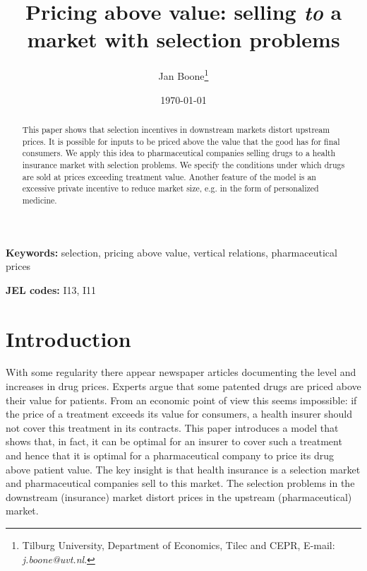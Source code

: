 \documentclass[a4paper,12pt]{article}
\author{Jan Boone\thanks{Tilburg University, Department of Economics, Tilec and CEPR, E-mail: \textit{j.boone@uvt.nl}.}}
\date{\today}
\title{Pricing above value: selling \emph{to} a market with selection problems}
\begin{document}
\maketitle
\maketitle
\begin{abstract}
This paper shows that selection incentives in downstream markets distort upstream prices. It is possible for inputs to be priced above the value that the good has for final consumers. We apply this idea to pharmaceutical companies selling drugs to a health insurance market with selection problems. We specify the conditions under which drugs are sold at prices exceeding treatment value. Another feature of the model is an excessive private incentive to reduce market size, e.g. in the form of personalized medicine.
\end{abstract}

\textbf{Keywords:} selection, pricing above value, vertical relations, pharmaceutical prices

\textbf{JEL codes:} I13, I11


\newpage

\section{Introduction}
\label{sec:org429004f}

With some regularity there appear newspaper articles documenting the level and increases in drug prices. Experts argue that some patented drugs are priced above their value for patients. From an economic point of view this seems impossible: if the price of a treatment exceeds its value for consumers, a health insurer should not cover this treatment in its contracts. This paper introduces a model that shows that, in fact, it can be optimal for an insurer to cover such a treatment and hence that it is optimal for a pharmaceutical company to price its drug above patient value. The key insight is that health insurance is a selection market and pharmaceutical companies sell to this market. The selection problems in the downstream (insurance) market distort prices in the upstream (pharmaceutical) market.
\end{document}
